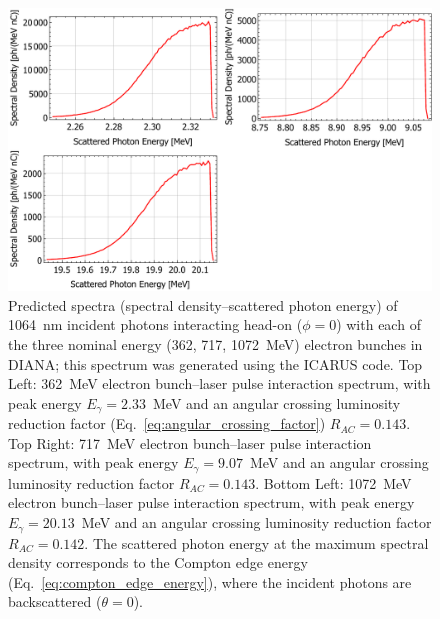 \documentclass[../main.tex]{subfiles}
\begin{document}
\begin{figure}[!h]
\centering
\includegraphics[width=\textwidth]{Figures/DIANA_Inverse_Compton_Source_Design/DIANA_spectra.pdf}
\caption{Predicted spectra (spectral density--scattered photon energy) of 1064~\si{\nano\meter} incident photons interacting head-on ($\phi=0$) with each of the three nominal energy (362, 717, 1072~\si{\mega\electronvolt}) electron bunches in DIANA; this spectrum was generated using the \textsc{ICARUS} code. Top Left: 362~\si{\mega\electronvolt}  electron bunch--laser pulse interaction spectrum, with peak energy $E_{\gamma}=2.33$~\si{\mega\electronvolt} and an angular crossing luminosity reduction factor (Eq.~\ref{eq:angular_crossing_factor}) $R_{AC}=0.143$. Top Right: 717~\si{\mega\electronvolt}  electron bunch--laser pulse interaction spectrum, with peak energy $E_{\gamma}=9.07$~\si{\mega\electronvolt} and an angular crossing luminosity reduction factor $R_{AC}=0.143$. Bottom Left: 1072~\si{\mega\electronvolt}  electron bunch--laser pulse interaction spectrum, with peak energy $E_{\gamma}=20.13$~\si{\mega\electronvolt} and an angular crossing luminosity reduction factor $R_{AC}=0.142$. The scattered photon energy at the maximum spectral density corresponds to the Compton edge energy (Eq.~\ref{eq:compton_edge_energy}), where the incident photons are backscattered ($\theta = 0$). }
\label{fig:DIANA_spectra}
\end{figure}
\end{document}

